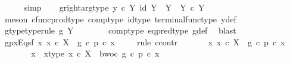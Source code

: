 \begin{isabellebody}
\ \ \ \ \isamarkupfalse%
\ simp\isanewline
\ \ \isamarkupfalse%
\ g{\isacharunderscore}{\kern0pt}right{\isacharunderscore}{\kern0pt}arg{\isacharunderscore}{\kern0pt}type{\isacharcolon}{\kern0pt}\ {\isachardoublequoteopen}{\isasymlangle}y{}\ {\isasymcirc}\isactrlsub c\ {\isasymbeta}\isactrlbsub Y\isactrlesub {\isacharcomma}{\kern0pt}\ id\ Y{\isasymrangle}\ {\isacharcolon}{\kern0pt}\ Y\ {\isasymrightarrow}\ Y\ {\isasymtimes}\isactrlsub c\ Y{\isachardoublequoteclose}\isanewline
\ \ \ \ \isamarkupfalse%
\ {\isacharparenleft}{\kern0pt}meson\ cfunc{\isacharunderscore}{\kern0pt}prod{\isacharunderscore}{\kern0pt}type\ comp{\isacharunderscore}{\kern0pt}type\ id{\isacharunderscore}{\kern0pt}type\ terminal{\isacharunderscore}{\kern0pt}func{\isacharunderscore}{\kern0pt}type\ y{\isacharunderscore}{\kern0pt}def{\isacharparenright}{\kern0pt}\isanewline
\ \ \isamarkupfalse%
\ \isamarkupfalse%
\ g{\isacharunderscore}{\kern0pt}type{\isacharbrackleft}{\kern0pt}type{\isacharunderscore}{\kern0pt}rule{\isacharbrackright}{\kern0pt}{\isacharcolon}{\kern0pt}\ {\isachardoublequoteopen}g{\isacharcolon}{\kern0pt}\ Y\ {\isasymrightarrow}\ {\isasymOmega}{\isachardoublequoteclose}\isanewline
\ \ \ \ \isamarkupfalse%
\ comp{\isacharunderscore}{\kern0pt}type\ eq{\isacharunderscore}{\kern0pt}pred{\isacharunderscore}{\kern0pt}type\ g{\isacharunderscore}{\kern0pt}def\ \isamarkupfalse%
\ blast\isanewline
\isanewline
\ \ \isamarkupfalse%
\ gpx{\isacharunderscore}{\kern0pt}Eqs{\isacharunderscore}{\kern0pt}f{\isacharcolon}{\kern0pt}\ {\isachardoublequoteopen}{\isasymforall}x{\isachardot}{\kern0pt}\ x\ {\isasymin}\isactrlsub c\ X\ {\isasymlongrightarrow}\ g\ {\isasymcirc}\isactrlsub c\ p\ {\isasymcirc}\isactrlsub c\ x\ {\isacharequal}{\kern0pt}\ {\isasymf}{\isachardoublequoteclose}\isanewline
\ \ \isamarkupfalse%
{\isacharparenleft}{\kern0pt}rule\ ccontr{\isacharparenright}{\kern0pt}\isanewline
\ \ \ \ \isamarkupfalse%
\ {\isachardoublequoteopen}{\isasymnot}\ {\isacharparenleft}{\kern0pt}{\isasymforall}x{\isachardot}{\kern0pt}\ x\ {\isasymin}\isactrlsub c\ X\ {\isasymlongrightarrow}\ g\ {\isasymcirc}\isactrlsub c\ p\ {\isasymcirc}\isactrlsub c\ x\ {\isacharequal}{\kern0pt}\ {\isasymf}{\isacharparenright}{\kern0pt}{\isachardoublequoteclose}\isanewline
\ \ \ \ \isamarkupfalse%
\ \isamarkupfalse%
\ x\ \ x{\isacharunderscore}{\kern0pt}type{\isacharcolon}{\kern0pt}\ {\isachardoublequoteopen}x\ {\isasymin}\isactrlsub c\ X{\isachardoublequoteclose}\ \ bwoc{\isacharcolon}{\kern0pt}\ {\isachardoublequoteopen}g\ {\isasymcirc}\isactrlsub c\ p\ {\isasymcirc}\isactrlsub c\ x\ {\isasymnoteq}\ {\isasymf}{\isachardoublequoteclose}\isanewline

\end{isabellebody}
